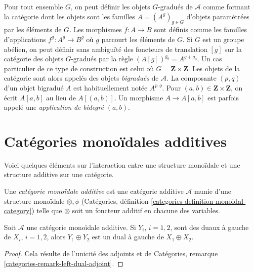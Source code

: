 \medskip\noindent
Pour tout ensemble $G$, on peut définir les objets $G$-gradués de $\mathcal{A}$
comme formant la catégorie dont les objets sont les familles $A = (A^g)_{g \in G}$
d'objets paramétrées par les éléments de $G$. Les morphismes
$f : A \to B$ sont définis comme les familles d'applications $f^g : A^g \to B^g$
où $g$ parcourt les éléments de $G$. Si $G$ est un groupe abélien,
on peut définir sans ambiguïté des foncteurs de translation $[g]$ sur la catégorie
des objets $G$-gradués par la règle $(A[g])^{g_0} = A^{g + g_0}$.
Un cas particulier de ce type de construction est celui où
$G = \mathbf{Z} \times \mathbf{Z}$. Les objets de la
catégorie sont alors appelés des objets {\it bigradués} de $\mathcal{A}$.
La composante $(p, q)$ d'un objet bigradué $A$ est habituellement notée
$A^{p, q}$. Pour $(a, b) \in \mathbf{Z} \times \mathbf{Z}$, on écrit
$A[a, b]$ au lieu de $A[(a, b)]$.
Un morphisme $A \to A[a, b]$ est parfois appelé une
{\it application de bidegré $(a, b)$}.






\section{Catégories monoïdales additives}
\label{section-monoidal}

\noindent
Voici quelques éléments sur l'interaction entre une structure monoïdale
et une structure additive sur une catégorie.

\begin{definition}
\label{definition-additive-monoidal}
Une {\it catégorie monoïdale additive} est une catégorie additive $\mathcal{A}$
munie d'une structure monoïdale $\otimes, \phi$
(Catégories, définition \ref{categories-definition-monoidal-category})
telle que $\otimes$ soit un foncteur additif en chacune des variables.
\end{definition}

\begin{lemma}
\label{lemma-additive-dual}
Soit $\mathcal{A}$ une catégorie monoïdale additive.
Si $Y_i$, $i = 1, 2$, sont des duaux à gauche de $X_i$, $i = 1, 2$, alors
$Y_1 \oplus Y_2$ est un dual à gauche de $X_1 \oplus X_2$.
\end{lemma}

\begin{proof}
Cela résulte de l'unicité des adjoints et de
Catégories, remarque \ref{categories-remark-left-dual-adjoint}.
\end{proof}

